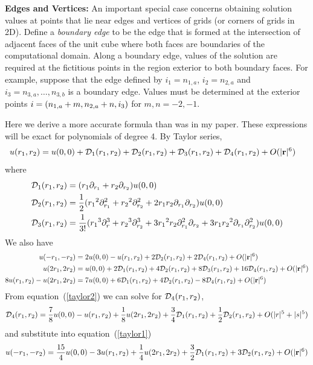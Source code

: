 \documentclass[10pt]{article}
\begin{document}
{\bf Edges and Vertices:}
An important special case concerns obtaining solution values at
points that lie near edges and vertices of grids
(or corners of grids in 2D).  Define a
{\it boundary edge} to be the edge that is formed at the intersection
of adjacent
faces of the unit cube where both faces are boundaries of the
computational domain.
Along a boundary edge, values of the solution are required at the
fictitious points in the region exterior to both boundary
faces.  For example, suppose that the edge defined by
$i_1=n_{1,a}$, $i_2=n_{2,a}$ and $i_3=n_{3,a},\ldots,n_{3,b}$
is a boundary edge.
Values must be determined at the exterior points
$i=(n_{1,a}+m,n_{2,a}+n,i_3)$ for $m,n=-2,-1$.


\newcommand{\ra}{{r_1}}
\newcommand{\rb}{{r_2}}
\newcommand{\rc}{{r_3}}
\newcommand{\trunc}{O(|\rv|^6)}
Here we derive a more accurate formula than was in my paper. These expressions will be 
exact for polynomials of degree 4. 
By Taylor series,
\begin{align*}
  u(\ra,\rb)&= u(0,0) + \Ds_1(\ra,\rb) + \Ds_2(\ra,\rb) + \Ds_3(\ra,\rb) + \Ds_4(\ra,\rb) + \trunc
\end{align*}
where
\begin{align*}
  \Ds_1(\ra,\rb) &= (\ra \partial_\ra + \rb \partial_\rb ) u(0,0) \\
  \Ds_2(\ra,\rb) &= {1\over2}( \ra^2\partial_\ra^2+\rb^2\partial_\rb^2+ 2\ra\rb\partial_\ra\partial_\rb  )u(0,0)  \\
  \Ds_3(\ra,\rb) &= {1\over3!}( \ra^3\partial_r^3 + \rb^3\partial_\rb^3 
                   +3\ra^2\rb\partial_\ra^2\partial_\rb + 3\ra\rb^2\partial_\ra\partial_\rb^2  )u(0,0)  
\end{align*}
We also have 
\begin{align}
 u(-\ra,-\rb) &= 2 u(0,0) - u(\ra,\rb) + 2\Ds_2(\ra,\rb) + 2\Ds_4(\ra,\rb)+ \trunc \label{taylor1} \\
  u(2\ra,2\rb)&= u(0,0) + 2\Ds_1(\ra,\rb) + 4\Ds_2(\ra,\rb) + 8\Ds_3(\ra,\rb) + 16\Ds_4(\ra,\rb) + \trunc\\
 8 u(\ra,\rb) - u(2\ra,2\rb) &= 7u(0,0) + 6\Ds_1(\ra,\rb) + 4 \Ds_2(\ra,\rb) -8 \Ds_4(\ra,\rb) + \trunc \label{taylor2} 
\end{align}
From equation~(\ref{taylor2}) we can solve for $\Ds_4(\ra,\rb)$,
\[
  \Ds_4(\ra,\rb) = {7\over8}u(0,0) - u(\ra,\rb) + {1\over 8}u(2\ra,2\rb) + {3\over4}\Ds_1(\ra,\rb) + {1\over2} \Ds_2(\ra,\rb)
                             + O(|r|^5+|s|^5)
\]
and substitute into equation~(\ref{taylor1}) 
\begin{equation}
  u(-\ra,-\rb) = {15\over4} u(0,0) - 3 u(\ra,\rb) + {1\over 4}u(2\ra,2\rb) + {3\over2}\Ds_1(\ra,\rb) 
                          + 3\Ds_2(\ra,\rb) +  \trunc \label{eq:corner1}
\end{equation}
\end{document}

